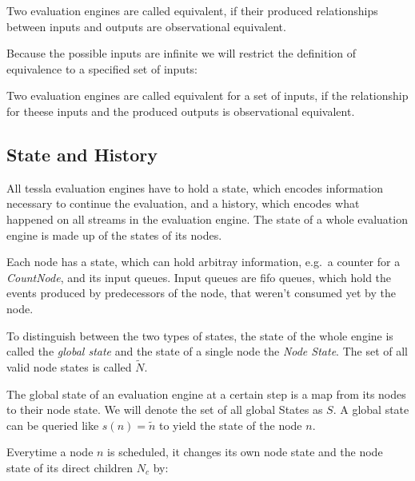 \begin{definition}[name=Equivalence of Evaluation Engines]\label{def:equivalence_eval_engine}
  Two evaluation engines are called equivalent, if their produced relationships between inputs and outputs are observational equivalent.
\end{definition}

Because the possible inputs are infinite we will restrict the definition of equivalence to a specified set of inputs:

\begin{definition}[name=Equivalence of Evaluation Engines for Specified Inputs]\label{def:equivalence_eval_engine_specific_inputs}
  Two evaluation engines are called equivalent for a set of inputs, if the relationship for theese inputs and the produced outputs is observational equivalent.
\end{definition}


\subsection{State and History}
\label{sec:concepts:def:state}

All \gls{tessla} evaluation engines have to hold a state, which encodes information necessary to continue the evaluation, and a history, which encodes what happened on all streams in the evaluation engine.
The state of a whole evaluation engine is made up of the states of its nodes.

Each node has a state, which can hold arbitray information, e.g.\ a counter for a \emph{CountNode}, and its input queues.
Input queues are \gls{fifo} queues, which hold the events produced by predecessors of the node, that weren't consumed yet by the node.

To distinguish between the two types of states, the state of the whole engine is called the \emph{global state} and the state of a single node the \emph{Node State}.
The set of all valid node states is called \(\widetilde{N}\).

The global state of an evaluation engine at a certain step is a map from its nodes to their node state.
We will denote the set of all global States as \(S\).
A global state can be queried like \(s(n) = \widetilde{n}\) to yield the state of the node \(n\).

Everytime a node \(n\) is scheduled, it changes its own node state and the node state of its direct children \(N_c\) by:

